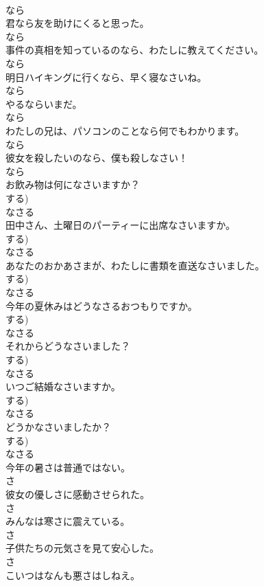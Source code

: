 \documentclass[8pt]{extreport}
\begin{document}
\begin{CJK}{UTF8}{min}
\\	なら
\\	君なら友を助けにくると思った。	
\\	なら
\\	事件の真相を知っているのなら、わたしに教えてください。	
\\	なら
\\	明日ハイキングに行くなら、早く寝なさいね。	
\\	なら
\\	やるならいまだ。	
\\	なら
\\	わたしの兄は、パソコンのことなら何でもわかります。	
\\	なら
\\	彼女を殺したいのなら、僕も殺しなさい！	
\\	なら
\\	お飲み物は何になさいますか？	
\\	する)	
\\	なさる
\\	田中さん、土曜日のパーティーに出席なさいますか。	
\\	する)	
\\	なさる
\\	あなたのおかあさまが、わたしに書類を直送なさいました。	
\\	する)	
\\	なさる
\\	今年の夏休みはどうなさるおつもりですか。	
\\	する)	
\\	なさる
\\	それからどうなさいました？	
\\	する)	
\\	なさる
\\	いつご結婚なさいますか。	
\\	する)	
\\	なさる
\\	どうかなさいましたか？	
\\	する)	
\\	なさる
\\	今年の暑さは普通ではない。	
\\	さ
\\	彼女の優しさに感動させられた。	
\\	さ
\\	みんなは寒さに震えている。	
\\	さ
\\	子供たちの元気さを見て安心した。	
\\	さ
\\	こいつはなんも悪さはしねえ。	

\end{CJK}
\end{document}
